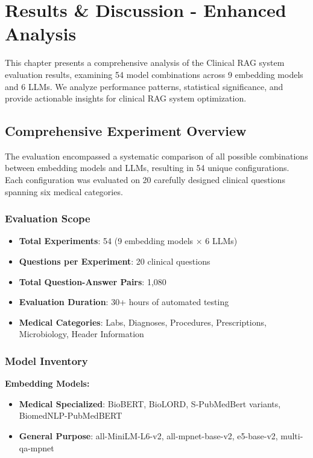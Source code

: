 \chapter{Results \& Discussion - Enhanced Analysis}
\label{chap:results_enhanced}

\noindent This chapter presents a comprehensive analysis of the Clinical RAG system evaluation results, examining 54 model combinations across 9 embedding models and 6 LLMs. We analyze performance patterns, statistical significance, and provide actionable insights for clinical RAG system optimization.

\section{Comprehensive Experiment Overview}

The evaluation encompassed a systematic comparison of all possible combinations between embedding models and LLMs, resulting in 54 unique configurations. Each configuration was evaluated on 20 carefully designed clinical questions spanning six medical categories.

\subsection{Evaluation Scope}
\begin{itemize}
    \item \textbf{Total Experiments}: 54 (9 embedding models × 6 LLMs)
    \item \textbf{Questions per Experiment}: 20 clinical questions
    \item \textbf{Total Question-Answer Pairs}: 1,080
    \item \textbf{Evaluation Duration}: 30+ hours of automated testing
    \item \textbf{Medical Categories}: Labs, Diagnoses, Procedures, Prescriptions, Microbiology, Header Information
\end{itemize}

\subsection{Model Inventory}

\textbf{Embedding Models:}
\begin{itemize}
    \item \textbf{Medical Specialized}: BioBERT, BioLORD, S-PubMedBert variants, BiomedNLP-PubMedBERT
    \item \textbf{General Purpose}: all-MiniLM-L6-v2, all-mpnet-base-v2, e5-base-v2, multi-qa-mpnet
\end{itemize}

